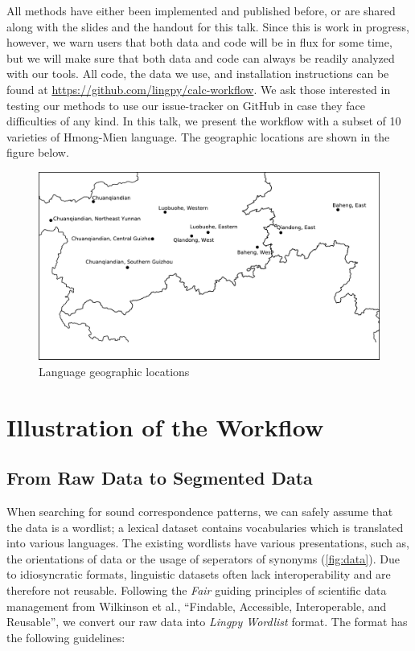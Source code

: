 \documentclass[xetex]{scrartcl}
\begin{document}
All methods have either been implemented and published before, or are shared along with the slides
and the handout for this talk. Since this is work in progress, however, we warn users that both data
and code will be in flux for some time, but we will make sure that both data and code can always be
readily analyzed with our tools. All code, the data we use, and installation instructions can be
found at \url{https://github.com/lingpy/calc-workflow}. We ask those interested in testing our
methods to use our issue-tracker on GitHub in case they face difficulties of any kind.
In this talk, we present the workflow with a subset of 10 varieties of Hmong-Mien language. The geographic locations are shown in the figure below.
\begin{figure}[htb]
  \centering
  \includegraphics[width=\textwidth]{Geographic.pdf}
  \caption{Language geographic locations}
  \label{fig:geo}
\end{figure}
\section{Illustration of the Workflow}\label{sec:wf}
\subsection{From Raw Data to Segmented Data}
When searching for sound correspondence patterns, we can safely assume that the data is a wordlist; a lexical dataset contains vocabularies which is translated into various languages. The existing wordlists have various presentations, such as, the orientations of data or the usage of seperators of synonyms (\ref{fig:data}). Due to idiosyncratic formats, linguistic datasets often lack interoperability and are therefore not reusable. Following the \textit{Fair} guiding principles of scientific data management from Wilkinson et al., ``Findable, Accessible, Interoperable, and Reusable''\citep{Wilkinson2016}, we convert our raw data into \textit{Lingpy Wordlist} format. 
The format has the following guidelines:
\end{document}
